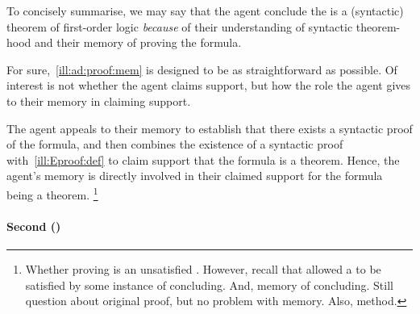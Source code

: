 \begin{note}
  To concisely summarise, we may say that the agent conclude the is a (syntactic) theorem of first-order logic \emph{because} of their understanding of syntactic theorem-hood and their memory of proving the formula.

  For sure,~\autoref{ill:ad:proof:mem} is designed to be as straightforward as possible.
  Of interest is not whether the agent claims support, but how the role the agent gives to their memory in claiming support.

  The agent appeals to their memory to establish that there exists a syntactic proof of the formula, and then combines the existence of a syntactic proof with~\ref{ill:Eproof:def} to claim support that the formula is a theorem.
  Hence, the agent's memory is directly involved in their claimed support for the formula being a theorem.%
    \footnote{
      \color{red}
      Whether proving is an unsatisfied \requ{}.
      However, recall that allowed a \requ{} to be satisfied by some instance of concluding.
      And, memory of concluding.
      Still question about original proof, but no problem with memory.
      Also, method.
    }
\end{note}

\paragraph{Second  (\adB{})}

